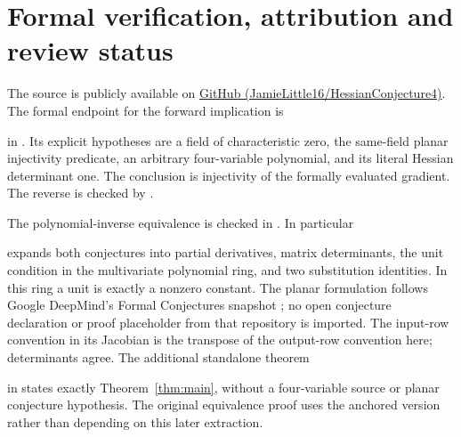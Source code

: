 \documentclass[11pt,a4paper]{article}
\begin{document}
\section{Formal verification, attribution and review status}\label{sec:verification}
The source is publicly available on \href{https://github.com/JamieLittle16/HessianConjecture4}{GitHub (JamieLittle16/HessianConjecture4)}. The formal endpoint for the forward implication is
\begin{quote}
\end{quote}
in . Its explicit hypotheses are a field of characteristic zero, the same-field planar injectivity predicate, an arbitrary four-variable polynomial, and its literal Hessian determinant one. The conclusion is injectivity of the formally evaluated gradient. The reverse is checked by .

The polynomial-inverse equivalence is checked in . In particular
\begin{quote}
\end{quote}
expands both conjectures into partial derivatives, matrix determinants, the unit condition in the multivariate polynomial ring, and two substitution identities. In this ring a unit is exactly a nonzero constant. The planar formulation follows Google DeepMind's Formal Conjectures snapshot  \cite{fc}; no open conjecture declaration or proof placeholder from that repository is imported. The input-row convention in its Jacobian is the transpose of the output-row convention here; determinants agree. The additional standalone theorem
\begin{quote}
\end{quote}
in  states exactly Theorem~\ref{thm:main}, without a four-variable source or planar conjecture hypothesis. The original equivalence proof uses the anchored version rather than depending on this later extraction.
\end{document}
